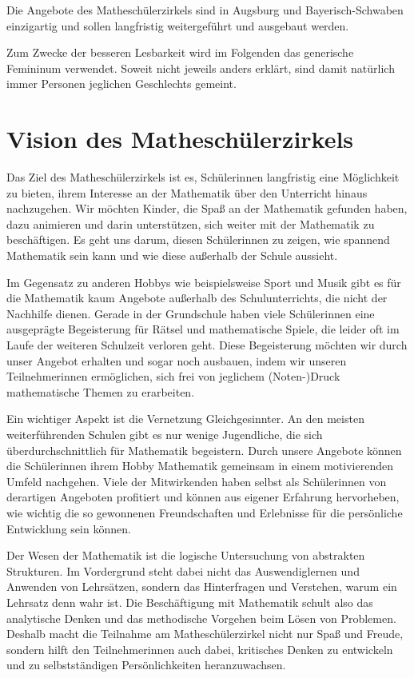 \documentclass[12pt]{zettel}
\begin{document}
Die Angebote des Matheschülerzirkels sind in Augsburg und Bayerisch-Schwaben einzigartig
und sollen langfristig weitergeführt und ausgebaut werden.

Zum Zwecke der besseren Lesbarkeit wird im Folgenden das generische Femininum verwendet. Soweit nicht jeweils anders erklärt, sind damit natürlich immer Personen jeglichen
Geschlechts gemeint.

\tableofcontents


\section{Vision des Matheschülerzirkels}

Das Ziel des Matheschülerzirkels ist es, Schülerinnen langfristig eine Möglichkeit zu bieten, ihrem Interesse an der
Mathematik über den Unterricht hinaus nachzugehen. Wir möchten Kinder, die Spaß an der Mathematik gefunden haben, dazu animieren und darin unterstützen, sich weiter
mit der Mathematik zu beschäftigen. Es geht uns darum, diesen Schülerinnen zu zeigen, wie spannend Mathematik sein kann und wie diese außerhalb der Schule aussieht.

Im Gegensatz zu anderen Hobbys wie beispielsweise Sport und Musik gibt es für die Mathematik kaum Angebote außerhalb des Schulunterrichts, die nicht der Nachhilfe dienen. Gerade
in der Grundschule haben viele Schülerinnen eine ausgeprägte Begeisterung für 
Rätsel und mathematische Spiele, die leider oft im Laufe der weiteren
Schulzeit verloren geht. Diese Begeisterung möchten wir
durch unser Angebot erhalten und sogar noch ausbauen, indem wir
unseren Teilnehmerinnen ermöglichen, sich frei von jeglichem
(Noten-)Druck mathematische Themen zu erarbeiten.

Ein wichtiger Aspekt ist die Vernetzung Gleichgesinnter. An
den meisten weiterführenden Schulen gibt es nur wenige Jugendliche, die sich überdurchschnittlich für Mathematik begeistern. Durch unsere Angebote können die
Schülerinnen ihrem Hobby Mathematik gemeinsam in einem motivierenden Umfeld nachgehen. Viele der Mitwirkenden haben selbst als Schülerinnen von derartigen Angeboten
profitiert und können aus eigener Erfahrung hervorheben, wie wichtig die so gewonnenen Freundschaften und Erlebnisse für die persönliche Entwicklung sein können.

Der Wesen der Mathematik ist die logische Untersuchung von abstrakten Strukturen. Im Vordergrund steht dabei nicht das Auswendiglernen und Anwenden von Lehrsätzen, sondern
das Hinterfragen und Verstehen, warum ein Lehrsatz denn wahr ist. Die Beschäftigung mit Mathematik schult also das analytische Denken und das methodische Vorgehen beim Lösen
von Problemen. Deshalb macht die Teilnahme am Matheschülerzirkel nicht nur Spaß und Freude, sondern hilft den Teilnehmerinnen auch dabei, kritisches Denken
zu entwickeln und zu selbstständigen Persönlichkeiten heranzuwachsen.
\end{document}
